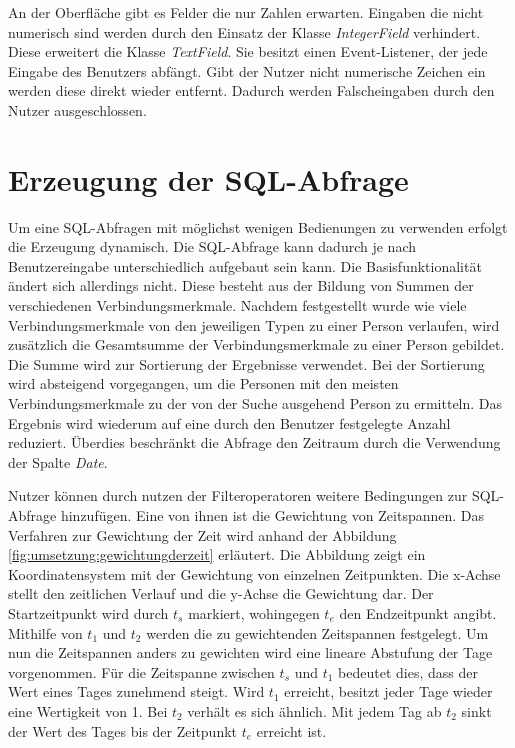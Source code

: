 An der Oberfläche gibt es Felder die nur Zahlen erwarten. Eingaben die nicht numerisch sind werden durch den Einsatz der Klasse \textit{IntegerField} verhindert. Diese erweitert die Klasse \textit{TextField}. Sie besitzt einen Event-Listener, der jede Eingabe des Benutzers abfängt. Gibt der Nutzer nicht numerische Zeichen ein werden diese direkt wieder entfernt. Dadurch werden Falscheingaben durch den Nutzer ausgeschlossen.

\section{Erzeugung der SQL-Abfrage}

Um eine SQL-Abfragen mit möglichst wenigen Bedienungen zu verwenden erfolgt die Erzeugung dynamisch. Die SQL-Abfrage kann dadurch je nach Benutzereingabe unterschiedlich aufgebaut sein kann. Die Basisfunktionalität ändert sich allerdings nicht. Diese besteht aus der Bildung von Summen der verschiedenen Verbindungsmerkmale. Nachdem festgestellt wurde wie viele Verbindungsmerkmale von den jeweiligen Typen zu einer Person verlaufen, wird zusätzlich die Gesamtsumme der Verbindungsmerkmale zu einer Person gebildet. Die Summe wird zur Sortierung der Ergebnisse verwendet. Bei der Sortierung wird absteigend vorgegangen, um die Personen mit den meisten Verbindungsmerkmale zu der von der Suche ausgehend Person zu ermitteln. Das Ergebnis wird wiederum auf eine durch den Benutzer festgelegte Anzahl reduziert. Überdies beschränkt die Abfrage den Zeitraum durch die Verwendung der Spalte \textit{Date}.

Nutzer können durch nutzen der Filteroperatoren weitere Bedingungen zur SQL-Abfrage hinzufügen. Eine von ihnen ist die Gewichtung von Zeitspannen. Das Verfahren zur Gewichtung der Zeit wird anhand der Abbildung \ref{fig:umsetzung:gewichtungderzeit} erläutert. Die Abbildung zeigt ein Koordinatensystem mit der Gewichtung von einzelnen Zeitpunkten. Die x-Achse stellt den zeitlichen Verlauf und die y-Achse die Gewichtung dar. Der Startzeitpunkt wird durch $t_{s}$ markiert, wohingegen $t_{e}$ den Endzeitpunkt angibt. Mithilfe von $t_1$ und $t_2$ werden die zu gewichtenden Zeitspannen festgelegt. Um nun die Zeitspannen anders zu gewichten wird eine lineare Abstufung der Tage vorgenommen. Für die Zeitspanne zwischen $t_{s}$ und $t_1$ bedeutet dies, dass der Wert eines Tages zunehmend steigt. Wird $t_1$ erreicht, besitzt jeder Tage wieder eine Wertigkeit von 1. Bei $t_2$ verhält es sich ähnlich. Mit jedem Tag ab $t_2$ sinkt der Wert des Tages bis der Zeitpunkt $t_{e}$ erreicht ist.


